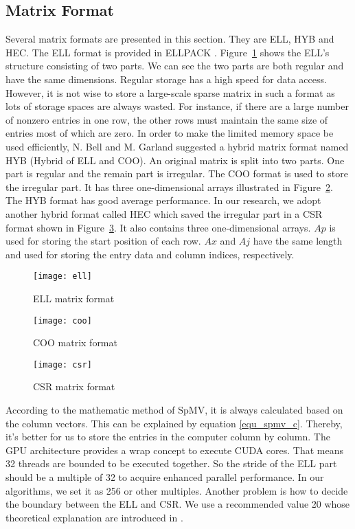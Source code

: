 \documentclass[runningheads,a4paper]{llncs}
\begin{document}
{\subsection{Matrix Format}
Several matrix formats are presented in this section. They are ELL, HYB and HEC. The ELL format is provided in ELLPACK \cite{ellpack}. Figure~\ref{fig_ell} shows the ELL's structure consisting of two parts. We can see the two parts are both regular and have the same dimensions. Regular storage has a high speed for data access. However, it is not wise to store a large-scale sparse matrix in such a format as lots of storage spaces are always wasted. For instance, if there are a large number of nonzero entries in one row, the other rows must maintain the same size of entries most of which are zero. In order to make the limited memory space be used efficiently, N. Bell and M. Garland suggested a hybrid matrix format named HYB (Hybrid of ELL and COO). An original matrix is split into two parts. One part is regular and the remain part is irregular. The COO format is used to store the irregular part. It has three one-dimensional arrays illustrated in Figure~\ref{fig_coo}. The HYB format has good average performance. In our research, we adopt another hybrid format called HEC which saved the irregular part in a CSR format shown in Figure~\ref{fig_csr}. It also contains three one-dimensional arrays. $Ap$ is used for storing the start position of each row. $Ax$ and $Aj$ have the same length and used for storing the entry data and column indices, respectively.

\begin{figure}[!tbh]
    \centering
    \texttt{[image: ell]}
    \caption{ELL matrix format}
    \label{fig_ell}
\end{figure}

\begin{figure}[!tbh]
    \centering
    \texttt{[image: coo]}
    \caption{COO matrix format}
    \label{fig_coo}
\end{figure}

\begin{figure}[!tbh]
    \centering
    \texttt{[image: csr]}
    \caption{CSR matrix format}
    \label{fig_csr}
\end{figure}

According to the mathematic method of SpMV, it is always calculated based on the column vectors. This can be explained by equation \eqref{equ_spmv_c}. Thereby, it's better for us to store the entries in the computer column by column. The GPU architecture provides a wrap concept to execute CUDA cores. That means 32 threads are bounded to be executed together. So the stride of the ELL part should be a multiple of 32 to acquire enhanced parallel performance. In our algorithms, we set it as 256 or other multiples. Another problem is how to decide the boundary between the ELL and CSR. We use a recommended value 20 whose theoretical explanation are introduced in \cite{nv-spmv2}.

}
\end{document}
